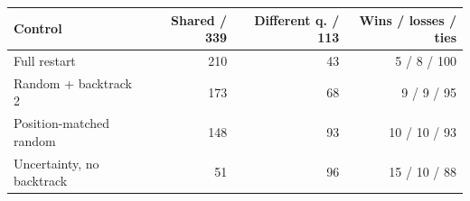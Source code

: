 \begin{tabular}{@{}lrrr@{}}
\toprule
Control & Shared / 339 & Different q. / 113 & Wins / losses / ties \\
\midrule
Full restart & 210 & 43 & 5 / 8 / 100 \\
Random + backtrack 2 & 173 & 68 & 9 / 9 / 95 \\
Position-matched random & 148 & 93 & 10 / 10 / 93 \\
Uncertainty, no backtrack & 51 & 96 & 15 / 10 / 88 \\
\bottomrule
\end{tabular}
